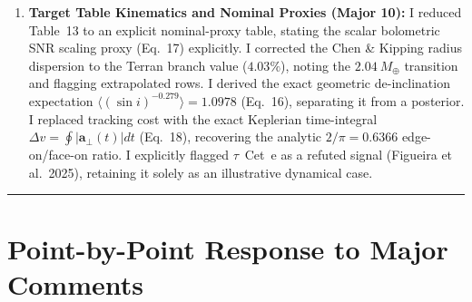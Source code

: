 \documentclass[11pt]{article}
\begin{document}
\begin{enumerate}
    \item \textbf{Target Table Kinematics and Nominal Proxies (Major 10):}
    I reduced Table~13 to an explicit nominal-proxy table, stating the scalar bolometric SNR scaling proxy (Eq.~17) explicitly. I corrected the Chen \& Kipping radius dispersion to the Terran branch value ($4.03\%$), noting the $2.04\ M_\oplus$ transition and flagging extrapolated rows. I derived the exact geometric de-inclination expectation $\langle(\sin i)^{-0.279}\rangle = 1.0978$ (Eq.~16), separating it from a posterior. I replaced tracking cost with the exact Keplerian time-integral $\Delta v = \oint |\mathbf{a}_\perp(t)| dt$ (Eq.~18), recovering the analytic $2/\pi = 0.6366$ edge-on/face-on ratio. I explicitly flagged $\tau$~Cet~e as a refuted signal (Figueira et al.\ 2025), retaining it solely as an illustrative dynamical case.
\end{enumerate}

\vspace{3mm}
\hrule
\vspace{3mm}

\section*{Point-by-Point Response to Major Comments}
\end{document}
